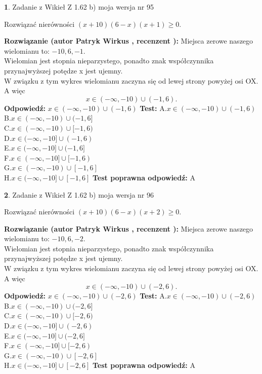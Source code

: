 \documentclass[12pt, a4paper]{article}
\theoremstyle{definition} %
\newtheorem{zad}{}
\newcommand{\zadStart}[1]{\begin{zad}#1\newline}
\newcommand{\zadStop}{\end{zad}}
\newcommand{\rozwStart}[2]{\noindent \textbf{Rozwiązanie (autor #1 , recenzent #2): }\newline}
\newcommand{\rozwStop}{\newline}
\newcommand{\odpStart}{\noindent \textbf{Odpowiedź:}\newline}
\newcommand{\odpStop}{\newline}
\newcommand{\testStart}{\noindent \textbf{Test:}\newline}
\newcommand{\testStop}{\newline}
\newcommand{\kluczStart}{\noindent \textbf{Test poprawna odpowiedź:}\newline}
\newcommand{\kluczStop}{\newline}
\begin{document}
\zadStart{Zadanie z Wikieł Z 1.62 b) moja wersja nr 95}

Rozwiązać nierówności $(x+10)(6-x)(x+1)\ge0$.
\zadStop
\rozwStart{Patryk Wirkus}{}
Miejsca zerowe naszego wielomianu to: $-10, 6, -1$.\\
Wielomian jest stopnia nieparzystego, ponadto znak współczynnika przy\linebreak najwyższej potędze x jest ujemny.\\ W związku z tym wykres wielomianu zaczyna się od lewej strony powyżej osi OX. A więc $$x \in (-\infty,-10) \cup (-1,6).$$
\rozwStop
\odpStart
$x \in (-\infty,-10) \cup (-1,6)$
\odpStop
\testStart
A.$x \in (-\infty,-10) \cup (-1,6)$\\
B.$x \in (-\infty,-10) \cup (-1,6]$\\
C.$x \in (-\infty,-10) \cup [-1,6)$\\
D.$x \in (-\infty,-10] \cup (-1,6)$\\
E.$x \in (-\infty,-10] \cup (-1,6]$\\
F.$x \in (-\infty,-10] \cup [-1,6)$\\
G.$x \in (-\infty,-10) \cup [-1,6]$\\
H.$x \in (-\infty,-10] \cup [-1,6]$
\testStop
\kluczStart
A
\kluczStop



\zadStart{Zadanie z Wikieł Z 1.62 b) moja wersja nr 96}

Rozwiązać nierówności $(x+10)(6-x)(x+2)\ge0$.
\zadStop
\rozwStart{Patryk Wirkus}{}
Miejsca zerowe naszego wielomianu to: $-10, 6, -2$.\\
Wielomian jest stopnia nieparzystego, ponadto znak współczynnika przy\linebreak najwyższej potędze x jest ujemny.\\ W związku z tym wykres wielomianu zaczyna się od lewej strony powyżej osi OX. A więc $$x \in (-\infty,-10) \cup (-2,6).$$
\rozwStop
\odpStart
$x \in (-\infty,-10) \cup (-2,6)$
\odpStop
\testStart
A.$x \in (-\infty,-10) \cup (-2,6)$\\
B.$x \in (-\infty,-10) \cup (-2,6]$\\
C.$x \in (-\infty,-10) \cup [-2,6)$\\
D.$x \in (-\infty,-10] \cup (-2,6)$\\
E.$x \in (-\infty,-10] \cup (-2,6]$\\
F.$x \in (-\infty,-10] \cup [-2,6)$\\
G.$x \in (-\infty,-10) \cup [-2,6]$\\
H.$x \in (-\infty,-10] \cup [-2,6]$
\testStop
\kluczStart
A
\kluczStop
\end{document}
